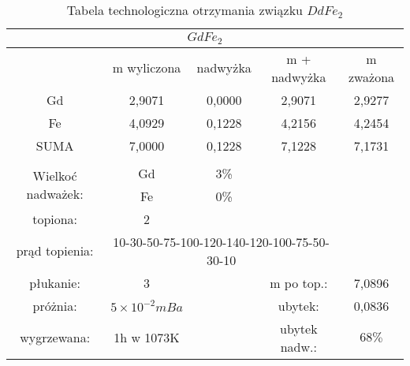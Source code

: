 \documentclass[a4paper,12pt]{article}
\numberwithin{equation}{section}
\begin{document}
\begin{appendices}
\begin{table}[!ht]
\footnotesize
\caption{Tabela technologiczna otrzymania związku $DdFe_{2}$ }
\label{Gdtechno}
\begin{tabular}{|c|c|c|c|c|}
\hline
 \multicolumn{5}{|c|}{$GdFe_{2} $}\\\hline\hline
	& m wyliczona		&	nadwyżka	& m + nadwyżka	&	m zważona \\\hline
Gd	&	2,9071	&	0,0000	&	2,9071	&	2,9277	\\\hline
Fe	&	4,0929	&	0,1228	&	4,2156	&	4,2454	\\\hline
SUMA	&	7,0000	&	0,1228	&	7,1228	&	7,1731	\\\hline
\multicolumn{5}{|c|}{}\\\cline{1-3}
\multirow{2}{*}{Wielkoć nadważek:}	
	&	Gd 	&	3\%	& 	\multicolumn{2}{c|}{}\\\cline{2-3}	
	&	Fe	&	0\%	&	\multicolumn{2}{c|}{}\\\cline{1-3}
\multicolumn{1}{|c}{topiona:}	&	\multicolumn{1}{c|}{2} 	&	\multicolumn{3}{c|}{}\\\cline{1-4}
\multicolumn{1}{|c}{prąd topienia:}	&	\multicolumn{3}{c|}{10-30-50-75-100-120-140-120-100-75-50-30-10}	&	\\\cline{1-5}
\multicolumn{1}{|c}{płukanie:}	&	\multicolumn{1}{c|}{3}	&	&	\multicolumn{1}{c}{m po top.:}	&	\multicolumn{1}{c|}{7,0896} 	 	\\\cline{1-2}\cline{4-5}
\multicolumn{1}{|c}{próżnia:}	&	\multicolumn{1}{c|}{$5\times10^{-2}mBa$}	&	&	\multicolumn{1}{c}{ubytek:}	&	\multicolumn{1}{c|}{0,0836} 	 	\\\cline{1-2}\cline{4-5}
\multicolumn{1}{|c}{wygrzewana:}	&	\multicolumn{1}{c|}{1h w 1073K }	&	&	\multicolumn{1}{c}{ubytek nadw.:}	&	\multicolumn{1}{c|}{$68\%$} 	 	\\\hline
\end{tabular}
\end{table}


\end{appendices}
\end{document}
